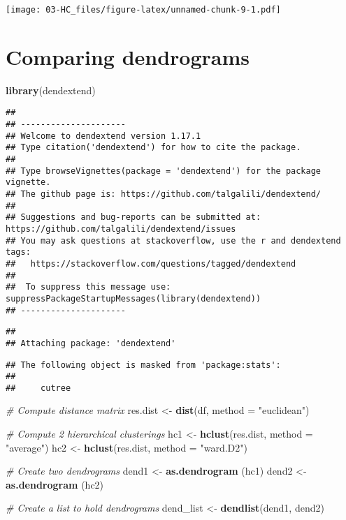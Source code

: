\documentclass[
]{elegantbook}
\newenvironment{Shaded}{\begin{snugshade}}{\end{snugshade}}
\newcommand{\AttributeTok}[1]{\textcolor[rgb]{0.13,0.29,0.53}{#1}}
\newcommand{\CommentTok}[1]{\textcolor[rgb]{0.56,0.35,0.01}{\textit{#1}}}
\newcommand{\FunctionTok}[1]{\textcolor[rgb]{0.13,0.29,0.53}{\textbf{#1}}}
\newcommand{\NormalTok}[1]{#1}
\newcommand{\OtherTok}[1]{\textcolor[rgb]{0.56,0.35,0.01}{#1}}
\newcommand{\StringTok}[1]{\textcolor[rgb]{0.31,0.60,0.02}{#1}}
\begin{document}
\texttt{[image: 03-HC\_files/figure-latex/unnamed-chunk-9-1.pdf]}

\hypertarget{comparing-dendrograms}{%
\section{Comparing dendrograms}\label{comparing-dendrograms}}

\begin{Shaded}
\begin{Highlighting}[]
\FunctionTok{library}\NormalTok{(dendextend)}
\end{Highlighting}
\end{Shaded}

\begin{verbatim}
## 
## ---------------------
## Welcome to dendextend version 1.17.1
## Type citation('dendextend') for how to cite the package.
## 
## Type browseVignettes(package = 'dendextend') for the package vignette.
## The github page is: https://github.com/talgalili/dendextend/
## 
## Suggestions and bug-reports can be submitted at: https://github.com/talgalili/dendextend/issues
## You may ask questions at stackoverflow, use the r and dendextend tags: 
##   https://stackoverflow.com/questions/tagged/dendextend
## 
##  To suppress this message use:  suppressPackageStartupMessages(library(dendextend))
## ---------------------
\end{verbatim}

\begin{verbatim}
## 
## Attaching package: 'dendextend'
\end{verbatim}

\begin{verbatim}
## The following object is masked from 'package:stats':
## 
##     cutree
\end{verbatim}

\begin{Shaded}
\begin{Highlighting}[]
\CommentTok{\# Compute distance matrix}
\NormalTok{res.dist }\OtherTok{\textless{}{-}} \FunctionTok{dist}\NormalTok{(df, }\AttributeTok{method =} \StringTok{"euclidean"}\NormalTok{)}

\CommentTok{\# Compute 2 hierarchical clusterings}
\NormalTok{hc1 }\OtherTok{\textless{}{-}} \FunctionTok{hclust}\NormalTok{(res.dist, }\AttributeTok{method =} \StringTok{"average"}\NormalTok{)}
\NormalTok{hc2 }\OtherTok{\textless{}{-}} \FunctionTok{hclust}\NormalTok{(res.dist, }\AttributeTok{method =} \StringTok{"ward.D2"}\NormalTok{)}

\CommentTok{\# Create two dendrograms}
\NormalTok{dend1 }\OtherTok{\textless{}{-}} \FunctionTok{as.dendrogram}\NormalTok{ (hc1)}
\NormalTok{dend2 }\OtherTok{\textless{}{-}} \FunctionTok{as.dendrogram}\NormalTok{ (hc2)}

\CommentTok{\# Create a list to hold dendrograms}
\NormalTok{dend\_list }\OtherTok{\textless{}{-}} \FunctionTok{dendlist}\NormalTok{(dend1, dend2)}
\end{Highlighting}
\end{Shaded}
\end{document}
